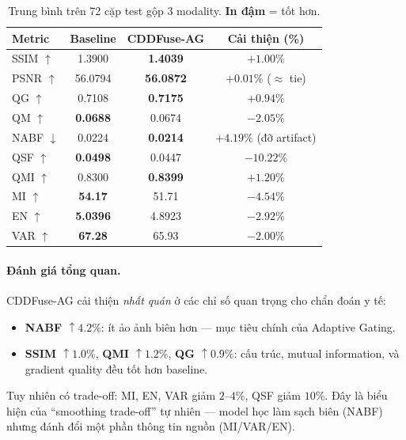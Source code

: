 \begin{table}[h]
\centering
\small
\caption{Trung bình trên 72 cặp test gộp 3 modality. \textbf{In đậm} = tốt hơn.}
\label{tab:cddfuse-ag-pooled}
\begin{tabular}{lccc}
\toprule
\textbf{Metric} & \textbf{Baseline} & \textbf{CDDFuse-AG} & \textbf{Cải thiện (\%)} \\
\midrule
SSIM $\uparrow$   & 1.3900          & \textbf{1.4039} & $+1.00\%$  \\
PSNR $\uparrow$   & 56.0794         & \textbf{56.0872} & $+0.01\%$ ($\approx$ tie) \\
QG   $\uparrow$   & 0.7108          & \textbf{0.7175} & $+0.94\%$ \\
QM   $\uparrow$   & \textbf{0.0688} & 0.0674          & $-2.05\%$ \\
NABF $\downarrow$ & 0.0224          & \textbf{0.0214} & \textbf{$+4.19\%$} (đỡ artifact) \\
QSF  $\uparrow$   & \textbf{0.0498} & 0.0447          & $-10.22\%$ \\
QMI  $\uparrow$   & 0.8300          & \textbf{0.8399} & $+1.20\%$ \\
MI   $\uparrow$   & \textbf{54.17}  & 51.71           & $-4.54\%$ \\
EN   $\uparrow$   & \textbf{5.0396} & 4.8923          & $-2.92\%$ \\
VAR  $\uparrow$   & \textbf{67.28}  & 65.93           & $-2.00\%$ \\
\bottomrule
\end{tabular}
\end{table}

\paragraph{Đánh giá tổng quan.}
CDDFuse-AG cải thiện \emph{nhất quán} ở các chỉ số quan trọng cho chẩn đoán y tế:
\begin{itemize}\itemsep0pt
    \item \textbf{NABF $\uparrow 4.2\%$}: ít ảo ảnh biên hơn --- mục tiêu chính của Adaptive Gating.
    \item \textbf{SSIM $\uparrow 1.0\%$}, \textbf{QMI $\uparrow 1.2\%$}, \textbf{QG $\uparrow 0.9\%$}: cấu trúc, mutual information, và gradient quality đều tốt hơn baseline.
\end{itemize}
Tuy nhiên có trade-off: MI, EN, VAR giảm $2\text{--}4\%$, QSF giảm $10\%$. Đây là biểu hiện của ``smoothing trade-off'' tự nhiên --- model học làm sạch biên (NABF) nhưng đánh đổi một phần thông tin nguồn (MI/VAR/EN).

